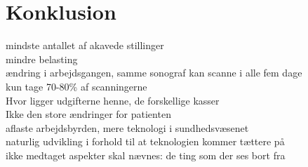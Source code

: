 \chapter{Konklusion}
mindste antallet af akavede stillinger\\
mindre belasting\\
ændring i arbejdsgangen, samme sonograf kan scanne i alle fem dage\\
kun tage 70-80\% af scanningerne \\
Hvor ligger udgifterne henne, de forskellige kasser \\
Ikke den store ændringer for patienten \\
aflaste arbejdsbyrden, mere teknologi i sundhedsvæsenet\\
naturlig udvikling i forhold til at teknologien kommer tættere på \\
ikke medtaget aspekter skal nævnes: de ting som der ses bort fra \\
